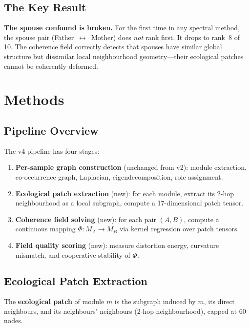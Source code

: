 \documentclass{../yalumba}
\begin{document}
\subsection{The Key Result}

\begin{keyfinding}
\textbf{The spouse confound is broken.}  For the first time in any spectral
method, the spouse pair (Father~$\leftrightarrow$~Mother) does \emph{not}
rank first.  It drops to rank~8 of 10.  The coherence field correctly
detects that spouses have similar global structure but dissimilar local
neighbourhood geometry---their ecological patches cannot be coherently
deformed.
\end{keyfinding}


\section{Methods}
\label{sec:methods}

\subsection{Pipeline Overview}

The v4 pipeline has four stages:

\begin{enumerate}
  \item \textbf{Per-sample graph construction} (unchanged from v2):
    module extraction, co-occurrence graph, Laplacian, eigendecomposition,
    role assignment.
  \item \textbf{Ecological patch extraction} (new): for each module,
    extract its 2-hop neighbourhood as a local subgraph, compute a
    17-dimensional patch tensor.
  \item \textbf{Coherence field solving} (new): for each pair $(A, B)$,
    compute a continuous mapping $\Phi: M_A \to M_B$ via kernel regression
    over patch tensors.
  \item \textbf{Field quality scoring} (new): measure distortion energy,
    curvature mismatch, and cooperative stability of $\Phi$.
\end{enumerate}

\subsection{Ecological Patch Extraction}

\begin{definition}
The \textbf{ecological patch} of module $m$ is the subgraph induced by $m$,
its direct neighbours, and its neighbours' neighbours (2-hop neighbourhood),
capped at 60 nodes.
\end{definition}
\end{document}

